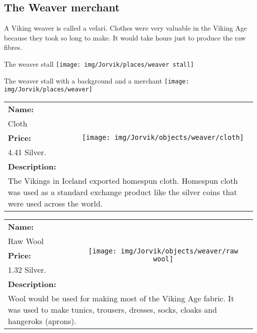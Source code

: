 

\clearpage
\subsection{The Weaver merchant}
\label{sec:appendix:moj:weaver}

A Viking weaver is called a vefari. Clothes were very valuable in the Viking Age because they took so long to make. It would take hours just to produce the raw fibres.

\begin{display}{The weaver stall}
	\label{fig:appendix:moj:places:weaver:stall}
	\texttt{[image: img/Jorvik/places/weaver stall]}
\end{display}

\begin{display}{The weaver stall with a background and a merchant}
	\label{fig:appendix:moj:places:weaver}
	\texttt{[image: img/Jorvik/places/weaver]}
\end{display}
\clearpage


\begin{table}[ht!]
	\centering
	\begin{tabular}{ p{3cm} c }\toprule
		\textbf{Name:} & \multirow{5}{*}{\texttt{[image: img/Jorvik/objects/weaver/cloth]}}\\
		Cloth & \\ 
		\textbf{Price:} & \\
		4.41  Silver. & \\ 
		\textbf{Description:} & \\
		\multicolumn{2}{p{12cm}}{The Vikings in Iceland exported homespun cloth. Homespun cloth was used as a standard exchange product like the silver coins that were used across the world.}\\
		\bottomrule
	\end{tabular}
\end{table}

\begin{table}[ht!]
	\centering
	\begin{tabular}{ p{3cm} c }\toprule
		\textbf{Name:} & \multirow{5}{*}{\texttt{[image: img/Jorvik/objects/weaver/raw wool]}}\\
		Raw Wool & \\ 
		\textbf{Price:} & \\
		1.32 Silver. & \\ 
		\textbf{Description:} & \\
		\multicolumn{2}{p{12cm}}{Wool would be used for making most of the Viking Age fabric. It was used to make tunics, trousers, dresses, socks, cloaks and hangeroks (aprons).}\\
		\bottomrule
	\end{tabular}
\end{table}

